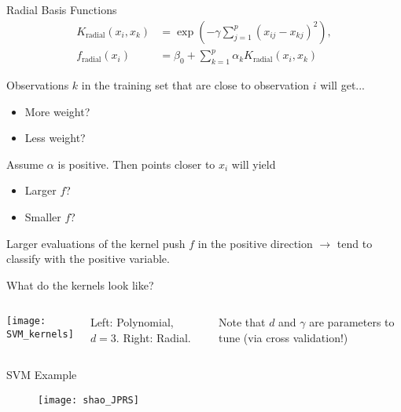 \documentclass[mathserif, aspectratio=169]{beamer}
\begin{document}
\begin{frame}{Radial Basis Functions}
	\begin{align*}
		K_\text{radial}(x_i,x_k) & = \exp(-\gamma \sum_{j=1}^p(x_{ij}-x_{kj})^2),\\ f_\text{radial}(x_i) &= \beta_0+\sum_{k=1}^p \alpha_k K_\text{radial}(x_i,x_k)
	\end{align*}

	Observations $k$ in the training set that are close to observation $i$ will get...
	\begin{itemize}
		\item More weight?
		\item Less weight?
	\end{itemize}	

	Assume $\alpha$ is positive.  Then points closer to $x_i$ will yield
	\begin{itemize}
		\item Larger $f$?
		\item Smaller $f$?
	\end{itemize}
Larger evaluations of the kernel push $f$ in the positive direction $\rightarrow$ tend to classify with the positive variable.
\end{frame}

\begin{frame}{What do the kernels look like?}
	\begin{columns}

		\texttt{[image: SVM\_kernels]}


		Left: Polynomial, $d=3$.  Right: Radial.

		\vspace{5mm}
		Note that $d$ and $\gamma$ are parameters to tune (via cross validation!)
	\end{columns}
\end{frame}

\begin{frame}{SVM Example}

	\begin{figure}
		\texttt{[image: shao\_JPRS]}
		\caption*{}
	\end{figure}
\end{frame}
\end{document}
